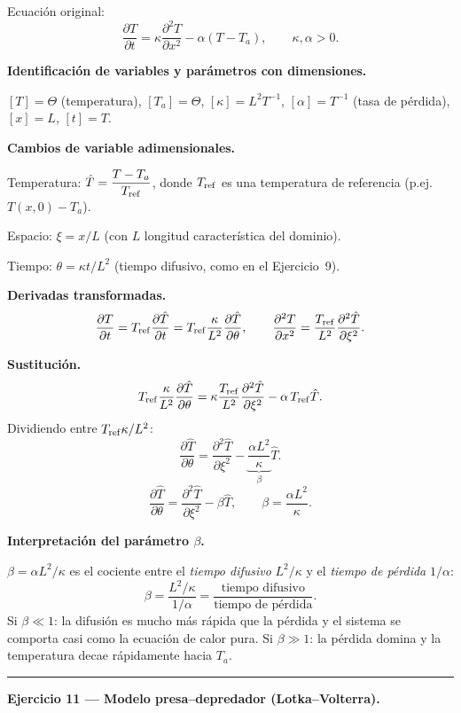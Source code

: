 \documentclass[12pt,letterpaper]{article}
\begin{document}
Ecuación original:
\[
  \frac{\partial T}{\partial t}=\kappa\frac{\partial^2 T}{\partial x^2}-\alpha(T-T_a),
  \qquad \kappa,\alpha>0.
\]

\textbf{Identificación de variables y parámetros con dimensiones.}

$[T]=\Theta$ (temperatura), $[T_a]=\Theta$, $[\kappa]=L^2T^{-1}$,
$[\alpha]=T^{-1}$ (tasa de pérdida), $[x]=L$, $[t]=T$.

\textbf{Cambios de variable adimensionales.}

Temperatura: $\hat{T}=\dfrac{T-T_a}{T_{\rm ref}}$,
donde $T_{\rm ref}$ es una temperatura de referencia (p.ej. $T(x,0)-T_a$).

Espacio: $\xi=x/L$ (con $L$ longitud característica del dominio).

Tiempo: $\theta=\kappa t/L^2$ (tiempo difusivo, como en el Ejercicio~9).

\textbf{Derivadas transformadas.}
\[
  \frac{\partial T}{\partial t}
  =T_{\rm ref}\frac{\partial\hat{T}}{\partial t}
  =T_{\rm ref}\frac{\kappa}{L^2}\frac{\partial\hat{T}}{\partial\theta},
  \qquad
  \frac{\partial^2 T}{\partial x^2}
  =\frac{T_{\rm ref}}{L^2}\frac{\partial^2\hat{T}}{\partial\xi^2}.
\]

\textbf{Sustitución.}
\[
  T_{\rm ref}\frac{\kappa}{L^2}\frac{\partial\hat{T}}{\partial\theta}
  =\kappa\frac{T_{\rm ref}}{L^2}\frac{\partial^2\hat{T}}{\partial\xi^2}
  -\alpha\,T_{\rm ref}\hat{T}.
\]
Dividiendo entre $T_{\rm ref}\kappa/L^2$:
\[
  \frac{\partial\hat{T}}{\partial\theta}
  =\frac{\partial^2\hat{T}}{\partial\xi^2}
  -\underbrace{\frac{\alpha L^2}{\kappa}}_{\displaystyle\beta}\hat{T}.
\]
\[
  \boxed{\frac{\partial\hat{T}}{\partial\theta}
  =\frac{\partial^2\hat{T}}{\partial\xi^2}-\beta\hat{T},
  \qquad \beta=\frac{\alpha L^2}{\kappa}.}
\]

\textbf{Interpretación del parámetro $\beta$.}

$\beta=\alpha L^2/\kappa$ es el cociente entre el \emph{tiempo difusivo} $L^2/\kappa$
y el \emph{tiempo de pérdida} $1/\alpha$:
\[
  \beta=\frac{L^2/\kappa}{1/\alpha}
  =\frac{\text{tiempo difusivo}}{\text{tiempo de pérdida}}.
\]
Si $\beta\ll 1$: la difusión es mucho más rápida que la pérdida y el sistema se
comporta casi como la ecuación de calor pura.
Si $\beta\gg 1$: la pérdida domina y la temperatura decae rápidamente hacia $T_a$.

\bigskip
\noindent\rule{\textwidth}{0.3pt}
\bigskip

\noindent\textbf{Ejercicio 11 — Modelo presa--depredador (Lotka--Volterra).}
\end{document}
